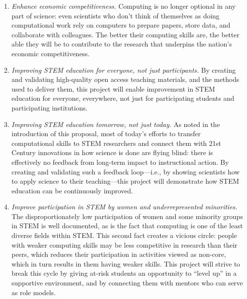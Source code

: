 \documentclass[11pt]{article}
\begin{document}
\begin{enumerate}

\item
  \emph{Enhance economic competitiveness.} Computing is no longer
  optional in any part of science: even scientists who don't think of
  themselves as doing computational work rely on computers to prepare
  papers, store data, and collaborate with colleagues.  The better
  their computing skills are, the better able they will be to
  contribute to the research that underpins the nation's economic
  competitiveness.

\item
  \emph{Improving STEM education for everyone, not just participants.}
  By creating and validating high-quality open access teaching
  materials, and the methods used to deliver them, this project will
  enable improvement in STEM education for everyone, everywhere, not
  just for participating students and participating institutions.

\item
  \emph{Improving STEM education tomorrow, not just today.}  As noted
  in the introduction of this proposal, most of today's efforts to
  transfer computational skills to STEM researchers and connect them
  with 21st Century innovations in how science is done are flying
  blind: there is effectively no feedback from long-term impact to
  instructional action.  By creating and validating such a feedback
  loop---i.e., by showing scientists how to apply science to their
  teaching---this project will demonstrate how STEM education can be
  continuously improved.

\item
  \emph{Improve participation in STEM by women and underrepresented
    minorities.} The disproportionately low participation of women and
  some minority groups in STEM is well documented, as is the fact that
  computing is one of the least diverse fields within STEM.  This
  second fact creates a vicious circle: people with weaker computing
  skills may be less competitive in research than their peers, which
  reduces their participation in activities viewed as non-core, which
  in turn results in them having weaker skills.  This project will
  strive to break this cycle by giving at-risk students an opportunity
  to ``level up'' in a supportive environment, and by connecting them
  with mentors who can serve as role models.

\end{enumerate}
\end{document}
